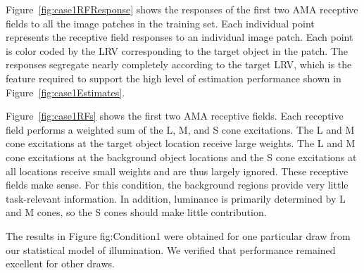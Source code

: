 \documentclass{jov}
\begin{document}
Figure~\ref{fig:case1RFResponse} shows the responses of the first two AMA receptive fields to all the image patches in the training set.
Each individual point represents the receptive field responses to an individual image patch.
Each point is color coded by the LRV corresponding to the target object in the patch.
The responses segregate nearly completely according to the target LRV, which is the feature required to support the high level 
of estimation performance shown in Figure~\ref{fig:case1Estimates}.

Figure~\ref{fig:case1RFs} shows the first two AMA receptive fields.
Each receptive field performs a weighted sum of the L, M, and S cone excitations.
The L and M cone excitations at the target object location receive large weights.
The L and M cone excitations at the background object locations and the S cone excitations at all locations receive small weights and are thus largely ignored. 
These receptive fields make sense.
For this condition, the background regions provide very little task-relevant information. 
In addition, luminance is primarily determined by L and M cones, so the S cones should make little
contribution.

The results in Figure {fig:Condition1} were obtained for one particular draw from our statistical model of illumination.
We verified that performance remained excellent for other draws.

%
\end{document}
